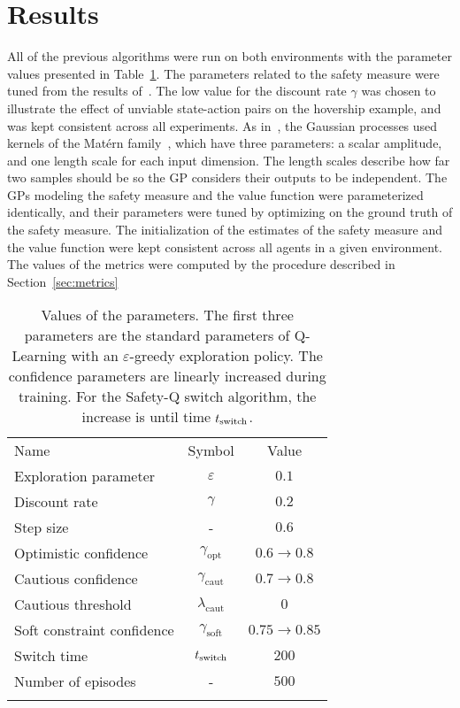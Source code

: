 \section{Results} \label{sec:results}
All of the previous algorithms were run on both environments with the parameter values presented in Table~\ref{tab:parameters}. The parameters related to the safety measure were tuned from the results of~\textcite{heim2020learnable}. The low value for the discount rate $\gamma$ was chosen to illustrate the effect of unviable state-action pairs on the hovership example, and was kept consistent across all experiments. As in~\cite{heim2020learnable}, the Gaussian processes used kernels of the Matérn family~\cite[Chapter\,18]{williams2006gaussian}, which have three parameters: a scalar amplitude, and one length scale for each input dimension. The length scales describe how far two samples should be so the GP considers their outputs to be independent. The GPs modeling the safety measure and the value function were parameterized identically, and their parameters were tuned by optimizing on the ground truth of the safety measure. The initialization of the estimates of the safety measure and the value function were kept consistent across all agents in a given environment. The values of the metrics were computed by the procedure described in Section~\ref{sec:metrics}

\begin{table}
	\centering
	\begin{tabular}{l|cc}
		Name & Symbol & Value\\
		\thickhline
		Exploration parameter & $\varepsilon$ & $0.1$\\
		Discount rate & $\gamma$ & $0.2$\\
		Step size & - & $0.6$\\
		Optimistic confidence & $\gamma_\text{opt}$ & $0.6\to0.8$\\
		Cautious confidence & $\gamma_\text{caut}$ & $0.7\to0.8$\\
		Cautious threshold & $\lambda_\text{caut}$ & $0$\\
		Soft constraint confidence & $\gamma_\text{soft}$ & $0.75\to0.85$\\
		Switch time & $t_\text{switch}$ & $200$\\
		Number of episodes & - & $500$\\
		\thickhline
	\end{tabular}
	\caption{Values of the parameters. The first three parameters are the standard parameters of Q-Learning with an $\varepsilon$-greedy exploration policy. The confidence parameters are linearly increased during training. For the Safety-Q switch algorithm, the increase is until time $t_\text{switch}$.}
	\label{tab:parameters}
\end{table}

